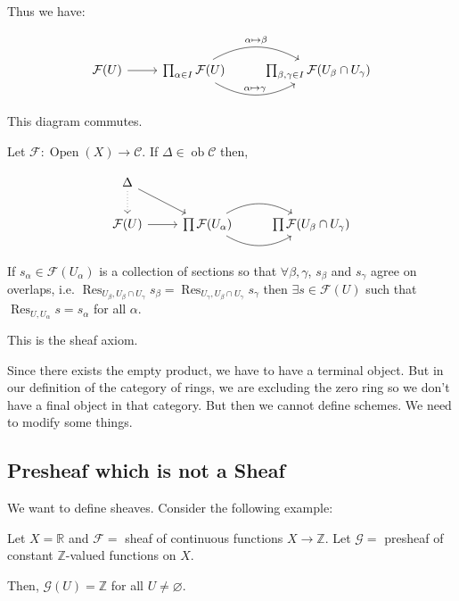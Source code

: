 \documentclass{article}
\theoremstyle{definition}
\begin{document}
    Thus we have:

    \[
        \begin{tikzcd}
            \mathcal{F}(U) \ar[r] & \prod_{\alpha \in I} \mathcal{F}(U) \ar[r, bend left, "\alpha \mapsto \beta"] \ar[r, bend right, "\alpha \mapsto \gamma"] & \prod_{\beta, \gamma\in I} \mathcal{F}(U_\beta \cap U_\gamma)
        \end{tikzcd}
    \]

    This diagram commutes.

    Let \(\mathcal{F}: \operatorname{Open}(X) \to \mathcal{C}\). If \(\Delta \in \operatorname{ob} \mathcal{C}\) then,

    \[
        \begin{tikzcd}
            \Delta \ar[d,dotted] \ar[rd] \\ \mathcal{F}(U) \ar[r] & \prod \mathcal{F}(U_\alpha) \ar[r, bend right] \ar[r, bend left] & \prod \mathcal{F} (U_\beta \cap U_\gamma)
        \end{tikzcd}
    \]

    If \(s_\alpha \in \mathcal{F}(U_\alpha)\) is a collection of sections so that \(\forall \beta ,\gamma\), \(s_\beta\) and \(s_\gamma\) agree on overlaps, i.e. \(\operatorname{Res}_{U_\beta, U_\beta \cap U_\gamma} s_\beta = \operatorname{Res}_{U_\gamma , U_\beta \cap U_\gamma} s_\gamma\) then \(\exists s\in \mathcal{F}(U)\) such that \(\operatorname{Res}_{U, U_\alpha} s = s_\alpha\) for all \(\alpha\).

    This is the sheaf axiom.

    Since there exists the empty product, we have to have a terminal object. But in our definition of the category of rings, we are excluding the zero ring so we don't have a final object in that category. But then we cannot define schemes. We need to modify some things.

    \subsection*{Presheaf which is not a Sheaf}

    We want to define sheaves. Consider the following example:

    Let \(X = \mathbb{R}\) and \(\mathcal{F} =\) sheaf of continuous functions \(X \to \mathbb{Z}\). Let \(\mathcal{G} =\) presheaf of constant \(\mathbb{Z}\)-valued functions on \(X\).

    Then, \(\mathcal{G}(U) = \mathbb{Z}\) for all \(U\neq \varnothing\).
\end{document}
